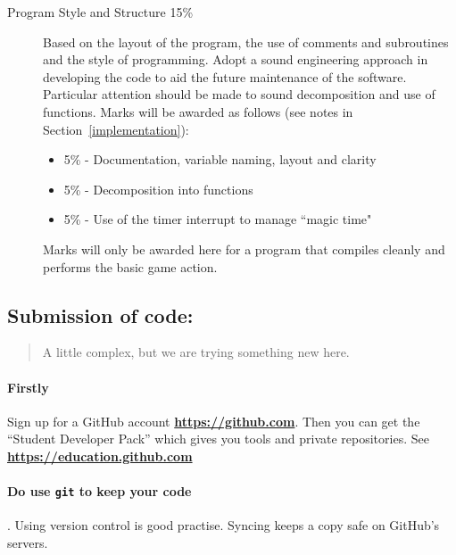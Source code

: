 \documentclass[a4paper]{article}
\begin{document}
{\begin{description}
\item [Program Style and Structure 15\%] Based on the layout of the
  program, the use of comments and subroutines and the style of
  programming. Adopt a sound engineering approach in developing the
  code to aid the future maintenance of the software.  Particular
  attention should be made to sound decomposition and use of
  functions.  Marks will be awarded as follows (see notes in
  Section~\ref{implementation}):
\begin{itemize}
\item 5\% - Documentation, variable naming, layout and clarity
\item 5\% - Decomposition into functions 
\item 5\% - Use of the timer interrupt to manage ``magic time"
\end{itemize}
Marks will only be awarded here for a program that compiles cleanly
and performs the basic game action. 
\end{description}

\clearpage
\subsection{Submission of code:}  
\begin{quote}
  A little complex, but we are trying something new here.
\end{quote}

\paragraph{Firstly} Sign up for a GitHub account
\textbf{\url{https://github.com}}.  Then you can get the ``Student Developer
Pack''  which gives you tools and private repositories.
See \textbf{\url{https://education.github.com}}

\paragraph{Do use \texttt{git} to keep  your code}.  Using version
control is good practise.  Syncing  keeps a copy safe on GitHub's
servers.

}
\end{document}
